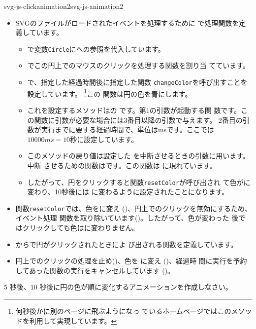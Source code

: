 {}
{svg-js-clickanimation2}{svg-js-animation2}
\begin{itemize}
 \item SVGのファイルがロードされたイベントを処理するために
			 で処理関数を定義しています。
	\begin{itemize}
	 \item {}で変数\texttt{Circle}にへの参照を代入しています。
	 \item {}でこの円上でのマウスのクリックを処理する関数を割り当
       てています。
	 \item {}で、指定した経過時間後に指定した関数
       \texttt{changeColor}を呼び出すことを設定しています。
       \footnote{何秒後かに別のページに飛ぶようになっ
       ているホームページではこのメソッドを利用して実現しています。}この
       関数は円の色を青にします。
	 \item これを設定するメソッドはの
       です。第1の引数が起動する関
       数です。この関数に引数が必要な場合には3番目以降の引数で与えます。
         2番目の引数が実行までに要する経過時間で、単位はmsです。ここでは
         $10000ms = 10秒$に設定しています。
	 \item このメソッドの戻り値は設定した
       を中断させるときの引数に用います。中断
       させるための関数はです。この関数は
       に現れています。
 \item したがって、円をクリックすると関数\texttt{resetColor}が呼び出され
       て色がに変わり、10秒後には
       に変わるように設定されたことになります。
			 \end{itemize}
 \item 関数\texttt{resetColor}では、色をに変え
       ()、円上でのクリックを無効にするため、イベント処理
       関数を取り除いています()。したがって、色が変わった
       後ではクリックしても色はに変わりません。
 \item {}からで円がクリックされたときによ
       び出される関数を定義しています。
 \item 円上でのクリックの処理を止め()、色を
       に変え
       ()、経過時
       間に実行を予約してあった関数の実行をキャンセルしています
       ()。
			 \end{itemize}
\begin{Problem}\upshape
$5$  秒後、$10$ 秒後に円の色が順に変化するアニメーションを作成しなさい。
\end{Problem}
